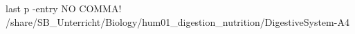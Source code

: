 
 \clearpage
     last p -entry NO COMMA!
     {/share/SB_Unterricht/Biology/hum01_digestion_nutrition/DigestiveSystem-A4} 

\clearpage
\enlargethispage{2cm}
\hspace{-4.6cm}
\karo{16cm}{24cm}
